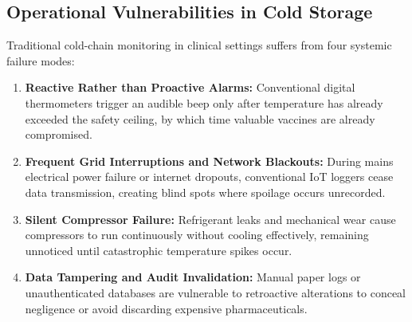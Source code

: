 \documentclass[11pt,a4paper]{article}
\begin{document}
\subsection{Operational Vulnerabilities in Cold Storage}
Traditional cold-chain monitoring in clinical settings suffers from four systemic failure modes:
\begin{enumerate}[label=(\roman*),leftmargin=2em,itemsep=2pt]
    \item \textbf{Reactive Rather than Proactive Alarms:} Conventional digital thermometers trigger an audible beep only after temperature has already exceeded the safety ceiling, by which time valuable vaccines are already compromised.
    \item \textbf{Frequent Grid Interruptions and Network Blackouts:} During mains electrical power failure or internet dropouts, conventional IoT loggers cease data transmission, creating blind spots where spoilage occurs unrecorded.
    \item \textbf{Silent Compressor Failure:} Refrigerant leaks and mechanical wear cause compressors to run continuously without cooling effectively, remaining unnoticed until catastrophic temperature spikes occur.
    \item \textbf{Data Tampering and Audit Invalidation:} Manual paper logs or unauthenticated databases are vulnerable to retroactive alterations to conceal negligence or avoid discarding expensive pharmaceuticals.
\end{enumerate}
\end{document}
